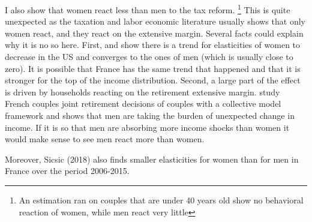 I also show that women react less than men to the tax reform.
\footnote{An estimation ran on couples that are under 40 years old show no behavioral reaction of women, while men react very little}
This is quite unexpected as the taxation and labor economic literature usually shows that only women react, and they react on the extensive margin. Several facts could explain why it is no so here. First,  \citet{blau2007changes} and \citet{heim2007incredible} show there is a trend for elasticities of women to decrease in the US and converges to the ones of men (which is usually close to zero). It is possible that France has the same trend that happened and that it is stronger for the top of the income distribution. 
Second, a large part of the effect is driven by households reacting on the retirement extensive margin. \citet{perdrant2018} study French couples joint retirement decisions of couples with a collective model framework and shows that men are taking the burden of unexpected change in income. If it is so that men are absorbing more income shocks than women it would make sense to see men react more than women.

Moreover, Sicsic (2018) also finds smaller elasticities for women than for men in France over the period 2006-2015.









